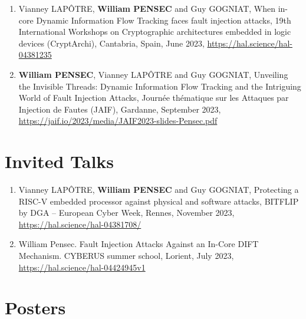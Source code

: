 \begin{enumerate}
    \item Vianney LAPÔTRE, \textbf{William PENSEC} and Guy GOGNIAT, When in-core Dynamic Information Flow Tracking faces fault injection attacks, 19th International Workshops on Cryptographic architectures embedded in logic devices (CryptArchi), Cantabria, Spain, June 2023, \url{https://hal.science/hal-04381235}
    \item \textbf{William PENSEC}, Vianney LAPÔTRE and Guy GOGNIAT, Unveiling the Invisible Threads: Dynamic Information Flow Tracking and the Intriguing World of Fault Injection Attacks, Journée thématique sur les Attaques par Injection de Fautes (JAIF), Gardanne, September 2023, \url{https://jaif.io/2023/media/JAIF2023-slides-Pensec.pdf}
\end{enumerate}
\section{Invited Talks}

\begin{enumerate}
    \item Vianney LAPÔTRE, \textbf{William PENSEC} and Guy GOGNIAT, Protecting a RISC-V embedded processor against physical and software attacks, BITFLIP by DGA -- European Cyber Week, Rennes, November 2023, \url{https://hal.science/hal-04381708/}
    \item William Pensec. Fault Injection Attacks Against an In-Core DIFT Mechanism. CYBERUS summer school, Lorient, July 2023, \url{https://hal.science/hal-04424945v1}
\end{enumerate}
\section{Posters}

